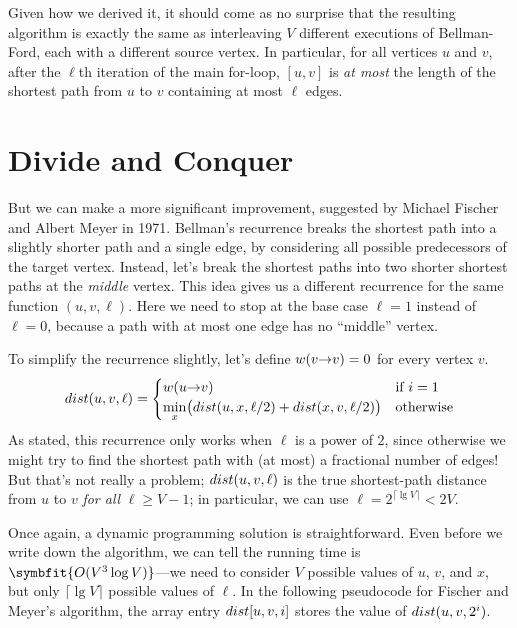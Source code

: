 Given how we derived it, it should come as no surprise that the resulting algorithm is exactly the same as interleaving $V$ different executions of Bellman-Ford, each with a different source vertex.
In particular, for all vertices $u$ and $v$, after the $\ell$th iteration of the main for-loop, $[u, v]$ is \textit{at most} the length of the shortest path from $u$ to $v$ containing at most $\ell$ edges.

\section{Divide and Conquer}
\label{sec:9.6}

But we can make a more significant improvement, suggested by Michael Fischer and Albert Meyer in 1971.
Bellman’s recurrence breaks the shortest path into a slightly shorter path and a single edge, by considering all possible predecessors of the target vertex.
Instead, let’s break the shortest paths into two shorter shortest paths at the \textit{middle} vertex.
This idea gives us a different recurrence for the same function $(u, v, \ell)$.
Here we need to stop at the base case $\ell = 1$ instead of $\ell = 0$, because a path with at most one edge has no “middle” vertex.

To simplify the recurrence slightly, let’s define $w(v\mathord{\rightarrow}v) = 0$ for every vertex $v$.
\[
dist(u, v, \ell) = \begin{cases}
w(u\mathord{\rightarrow}v) & \text{if } i = 1\\
\displaystyle\min_x \bigl(dist(u, x, \ell/2) + dist(x, v, \ell/2)\bigr) & \text{otherwise}
\end{cases}
\]
As stated, this recurrence only works when $\ell$ is a power of $2$, since otherwise we might try to find the shortest path with (at most) a fractional number of edges!
But that’s not really a problem; $dist(u, v, \ell)$ is the true shortest-path distance from $u$ to $v$ \textit{for all} $\ell \ge V - 1$; in particular, we can use $\ell = 2^{\lceil \lg V\rceil} < 2V$.

Once again, a dynamic programming solution is straightforward.
Even before we write down the algorithm, we can tell the running time is $\symbfit{O(V^3 \log V)}$---we need to consider $V$ possible values of $u$, $v$, and $x$, but only $\lceil \lg V \rceil$ possible values of $\ell$.
In the following pseudocode for Fischer and Meyer’s algorithm, the array entry $dist[u, v, i]$ stores the value of $dist(u, v, 2^i)$.

